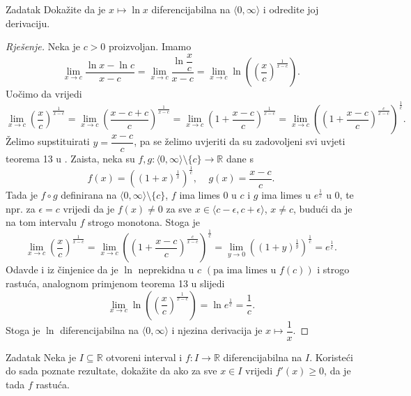 \begin{exercise}{Zadatak}
Dokažite da je \(x\mapsto \ln{x}\) diferencijabilna na \(\langle 0,\infty\rangle\) i odredite joj derivaciju.
\end{exercise}
\begin{proof}[Rješenje]
Neka je \(c>0\) proizvoljan. Imamo
\[\lim\limits_{x\to c}{\dfrac{\ln{x}-\ln{c}}{x-c}}=\lim\limits_{x\to c}{\dfrac{\ln{\dfrac{x}{c}}}{x-c}}=\lim\limits_{x\to c}{\ln\left(\left(\dfrac{x}{c}\right)^\frac{1}{x-c}\right)}.\]
Uočimo da vrijedi
\[\lim\limits_{x\to c}{\left(\dfrac{x}{c}\right)^\frac{1}{x-c}}=\lim\limits_{x\to c}{\left(\dfrac{x-c+c}{c}\right)^\frac{1}{x-c}}=\lim\limits_{x\to c}{\left(1+\dfrac{x-c}{c}\right)^\frac{1}{x-c}}=\lim\limits_{x\to c}{\left(\left(1+\dfrac{x-c}{c}\right)^\frac{c}{x-c}\right)^\frac{1}{c}}.\]
Želimo supstituirati \(y=\dfrac{x-c}{c}\), pa se želimo uvjeriti da su zadovoljeni svi uvjeti teorema 13 u \cite{14}. Zaista, neka su \(f, g : \langle 0, \infty\rangle\setminus\{c\}\to \mathbb{R}\) dane s 
\[f(x)=\left((1+x)^\frac{1}{x}\right)^\frac{1}{c},\;\;\;\;g(x)=\dfrac{x-c}{c}.\] 
Tada je \(f\circ g\) definirana na \(\langle 0, \infty\rangle\setminus\{c\}\), \(f\) ima limes \(0\) u \(c\) i \(g\) ima limes u \(e^\frac{1}{c}\) u \(0\), te npr. za \(\epsilon=c\) vrijedi da je \(f(x)\neq 0\) za sve \(x\in \langle c-\epsilon, c+\epsilon\rangle\), \(x\neq c\), budući da je na tom intervalu \(f\) strogo monotona. Stoga je
\[\lim\limits_{x\to c}{\left(\dfrac{x}{c}\right)^\frac{1}{x-c}}=\lim\limits_{x\to c}{\left(\left(1+\dfrac{x-c}{c}\right)^\frac{c}{x-c}\right)^\frac{1}{c}}=\lim\limits_{y\to 0}{\left((1+y)^\frac{1}{y}\right)^\frac{1}{c}}=e^\frac{1}{c}.\]
Odavde i iz činjenice da je \(\ln\) neprekidna u \(c\) \(\left(\text{pa ima limes u }f(c)\right)\) i strogo rastuća, analognom primjenom teorema 13 u \cite{14} slijedi
\[\lim\limits_{x\to c}{\ln\left(\left(\dfrac{x}{c}\right)^\frac{1}{x-c}\right)}=\ln{e^\frac{1}{c}}=\dfrac{1}{c}.\]
Stoga je \(\ln\) diferencijabilna na \(\langle 0, \infty\rangle\) i njezina derivacija je \(x\mapsto \dfrac{1}{x}\).
\end{proof}
\begin{exercise}{Zadatak}
Neka je \(I\subseteq \mathbb{R}\) otvoreni interval i \(f : I \to \mathbb{R}\) diferencijabilna na \(I\). Koristeći do sada poznate rezultate, dokažite da ako za sve \(x\in I\) vrijedi \(f'(x)\geq 0\), da je tada \(f\) rastuća.
\end{exercise}
